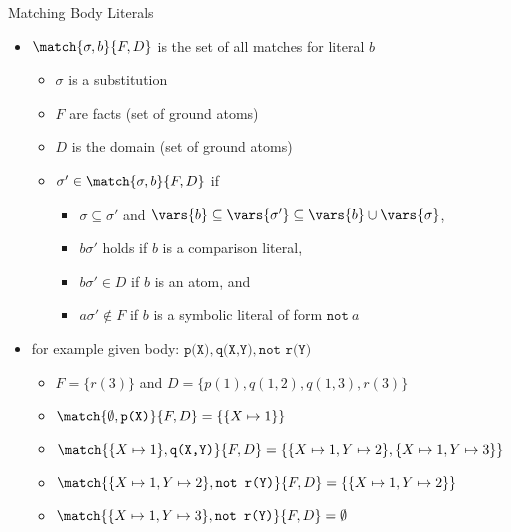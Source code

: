 \begin{frame}{Matching Body Literals}
    \begin{itemize}
      \item \(\match{\sigma,b}{F,D}\) is the set of \alert{all matches for literal} \(b\)
        \begin{itemize}
          \item \(\sigma\) is a substitution
          \item \(F\) are facts (set of ground atoms)
          \item \(D\) is the domain (set of ground atoms)
          \item \(\sigma' \in \match{\sigma,b}{F,D}\) if
            \begin{itemize}
              \item \(\sigma \subseteq \sigma'\) and \(\vars{b} \subseteq \vars{\sigma'} \subseteq \vars{b} \cup \vars{\sigma}\),
              \item \(b\sigma'\) holds if \(b\) is a comparison literal,
              \item \(b\sigma' \in D\) if \(b\) is an atom, and
              \item \(a\sigma' \not\in F\) if \(b\) is a symbolic literal of form \(\texttt{not}\ a\)
            \end{itemize}
        \end{itemize}
      \pause
      \item for \alert{example} given body:  \(\texttt{p(X)},\texttt{q(X,Y)},\texttt{not r(Y)}\)
        \begin{itemize}
          \item \(F = \{r(3)\}\) and \(D = \{p(1), q(1,2), q(1,3), r(3)\}\)
          \item \(\match{\emptyset, \texttt{p(X)}}{F,D} = \{ \{ X \mapsto 1 \} \}\)
          \item \(\match{\{X \mapsto 1\}, \texttt{q(X,Y)}}{F,D} = \{ \{ X \mapsto 1, Y \mapsto 2 \}, \{ X \mapsto 1, Y \mapsto 3 \} \}\)
          \item \(\match{\{X \mapsto 1, Y \mapsto 2 \}, \texttt{not r(Y)}}{F,D} = \{ \{ X \mapsto 1, Y \mapsto 2 \} \}\)
          \item \(\match{\{X \mapsto 1, Y \mapsto 3 \}, \texttt{not r(Y)}}{F,D} = \emptyset\)
        \end{itemize}
    \end{itemize}
\end{frame}

